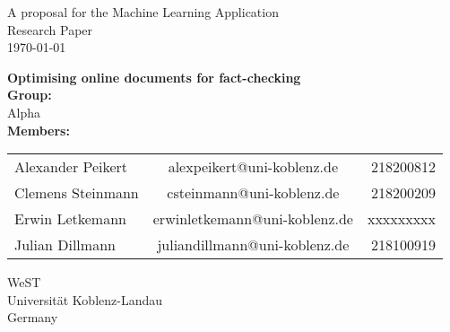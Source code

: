 \documentclass[10pt]{article}
\begin{document}
\begin{titlepage}
\begin{center}


A proposal for the Machine Learning Application\\
Research Paper\\
\vspace{4mm}
\today
\vspace{4mm}
\end{center}
\begin{center}
\textbf{\Large Optimising online documents for fact-checking}\\
\vspace{15mm}
\textbf{Group:}\\
\vspace{2mm}
Alpha \\
\vspace{15mm}
\textbf {Members:}\\
\vspace{2mm}
\end{center}
\begin{tabular}{ l c r }
  Alexander Peikert & alexpeikert@uni-koblenz.de & 218200812 \\
  Clemens Steinmann & csteinmann@uni-koblenz.de & 218200209 \\
  Erwin Letkemann & erwinletkemann@uni-koblenz.de & xxxxxxxxx \\
  Julian Dillmann & juliandillmann@uni-koblenz.de & 218100919 \\
\end{tabular}
\vfill
\begin{center}
\vspace{8mm}
WeST \\
Universität Koblenz-Landau \\
Germany \\
\vspace{2mm}
\end{center}
\clearpage
\end{titlepage}
\end{document}
